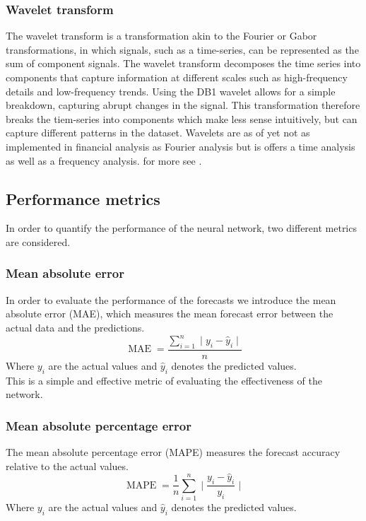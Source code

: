 \documentclass[10pt,a4paper]{article}
\numberwithin{equation}{section} %
\begin{document}
\subsubsection{Wavelet transform}
The wavelet transform is a transformation akin to the Fourier or Gabor transformations, in which signals, such as a time-series, can be represented as the sum of component signals. The wavelet transform decomposes the time series into components that capture information at different scales such as high-frequency details and low-frequency trends. Using the DB1 wavelet allows for a simple breakdown, capturing abrupt changes in the signal. This transformation therefore breaks the tiem-series into components which make less sense intuitively, but can capture different patterns in the dataset. Wavelets are as of yet not as implemented in financial analysis as Fourier analysis but is offers a time analysis as well as a frequency analysis. for more see \cite{zavanelli2023wavelet}. 
\subsection{Performance metrics}
In order to quantify the performance of the neural network, two different metrics are considered. 
\subsubsection{Mean absolute error}
 In order to evaluate the performance of the forecasts we introduce the mean absolute error (MAE), which measures the mean forecast error between the actual data and the predictions.
\begin{equation}
    \operatorname{MAE} = \frac{\sum^n_{i=1} \mid y_i - \hat{y}_i \mid }{n}
\end{equation} 
Where $y_i$ are the actual values and $\hat{y}_i$ denotes the predicted values.\\
This is a simple and effective metric of evaluating the effectiveness of the network.
\subsubsection{Mean absolute percentage error}
 The mean absolute percentage error (MAPE) measures the forecast accuracy relative to the actual values.
 \begin{equation}
     \operatorname{MAPE} = \frac{1}{n} \sum^{n}_{i=1}  \mid \frac{y_i - \hat{y}_i }{y_i} \mid
     \end{equation}
Where $y_i$ are the actual values and $\hat{y}_i$ denotes the predicted values.
\end{document}
